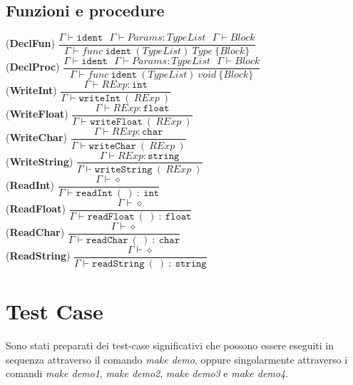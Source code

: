 \documentclass[12pt]{article}
\begin{document}
\subsection*{Funzioni e procedure}
\begin{center}
\noindent(\textbf{DeclFun})
$\dfrac{\Gamma \vdash \texttt{ident}\ \ \ \Gamma \vdash Params:TypeList\ \ \ \Gamma \vdash Block}{\Gamma \vdash func\ \texttt{ident}\ (TypeList)\ Type\ \{Block\}}$\\[0.1in]
\noindent(\textbf{DeclProc})
$\dfrac{\Gamma \vdash \texttt{ident}\ \ \ \Gamma \vdash Params:TypeList\ \ \ \Gamma \vdash Block}{\Gamma \vdash func\ \texttt{ident}\ (TypeList)\ void\ \{Block\}}$\\[0.1in]

\noindent(\textbf{WriteInt})
$\dfrac{\Gamma \vdash RExp:\texttt{int}}{\Gamma \vdash \texttt{writeInt}\ (\ RExp\ )}$\\[0.1in]
\noindent(\textbf{WriteFloat})
$\dfrac{\Gamma \vdash RExp:\texttt{float}}{\Gamma \vdash \texttt{writeFloat}\ (\ RExp\ )}$\\[0.1in]
\noindent(\textbf{WriteChar})
$\dfrac{\Gamma \vdash RExp:\texttt{char}}{\Gamma \vdash \texttt{writeChar}\ (\ RExp\ )}$\\[0.1in]
\noindent(\textbf{WriteString})
$\dfrac{\Gamma \vdash RExp:\texttt{string}}{\Gamma \vdash \texttt{writeString}\ (\ RExp\ )}$\\[0.1in]
\noindent(\textbf{ReadInt})
$\dfrac{\Gamma \vdash \diamond}{\Gamma \vdash \texttt{readInt}\ (\ )\ :\ \texttt{int}}$\\[0.1in]
\noindent(\textbf{ReadFloat})
$\dfrac{\Gamma \vdash \diamond}{\Gamma \vdash \texttt{readFloat}\ (\ )\ :\ \texttt{float}}$\\[0.1in]
\noindent(\textbf{ReadChar})
$\dfrac{\Gamma \vdash \diamond}{\Gamma \vdash\texttt{readChar}\ (\ )\ :\ \texttt{char}}$\\[0.1in]
\noindent(\textbf{ReadString})
$\dfrac{\Gamma \vdash \diamond}{\Gamma \vdash \texttt{readString}\ (\ )\ :\ \texttt{string}}$\\[0.1in]
\end{center}


\pagebreak
\section{Test Case}
Sono stati preparati dei test-case significativi che possono essere eseguiti in sequenza attraverso il comando \textit{make demo}, oppure singolarmente attraverso i comandi \textit{make demo1}, \textit{make demo2}, \textit{make demo3} e \textit{make demo4}.
\end{document}
